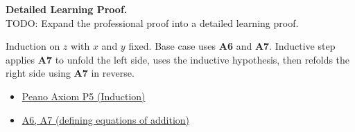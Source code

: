 \textbf{Detailed Learning Proof.}~\\
TODO: Expand the professional proof into a detailed learning proof.


\begin{remark*}
Induction on $z$ with $x$ and $y$ fixed. Base case uses \textbf{A6} and
\textbf{A7}. Inductive step applies \textbf{A7} to unfold the left side,
uses the inductive hypothesis, then refolds the right side using \textbf{A7}
in reverse.

\end{remark*}

\begin{dependencies}
\begin{itemize}
  \item \hyperref[ax:landau-peano]{Peano Axiom P5 (Induction)}
  \item \hyperref[thm:landau-addition-exists-unique]{A6, A7 (defining equations of addition)}
\end{itemize}

\end{dependencies}

\clearpage
